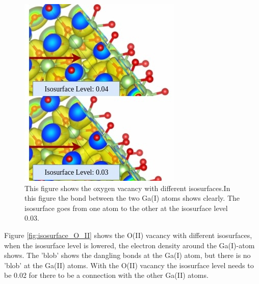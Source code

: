 \begin{figure}[H]
\includegraphics[width=0.7\linewidth]{../fig/isosurfaces/O_I/bond}\caption{This figure shows the oxygen vacancy with different isosurfaces.In this figure the bond between the two Ga(I) atoms shows clearly. The isosurface goes from one atom to the other at the isosurface level 0.03.}\label{fig:bond_O_I}
\end{figure}

Figure \ref{fig:isosurface_O_II} shows the O(II) vacancy with different isosurfaces, when the isosurface level is lowered, the electron density around the Ga(I)-atom shows. The 'blob' shows the dangling bonds at the Ga(I) atom, but there is no 'blob' at the Ga(II) atoms. With the O(II) vacancy the isosurface level needs to be 0.02 for there to be a connection with the other Ga(II) atoms.

